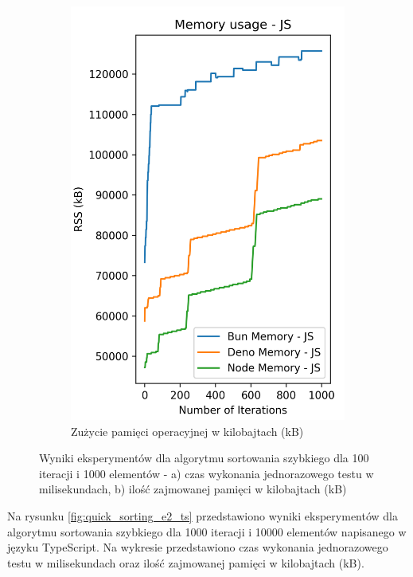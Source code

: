 \begin{figure}[H]
\begin{subfigure}[b]{0.4\textwidth}
    \includegraphics[width=\textwidth]{Figures/sorting/sorting_quick_1000_1000_js_memory.png}
    \caption{Zużycie pamięci operacyjnej w kilobajtach (kB)}
    \label{fig:quick_sorting_e2_memory}
  \end{subfigure}
  \caption{Wyniki eksperymentów dla algorytmu sortowania szybkiego dla 100 iteracji i 1000 elementów - a) czas wykonania jednorazowego testu w milisekundach, b) ilość zajmowanej pamięci w kilobajtach (kB)}
  \label{fig:quick_sorting_e2}
\end{figure}

Na rysunku \ref{fig:quick_sorting_e2_ts} przedstawiono wyniki eksperymentów dla algorytmu sortowania szybkiego dla 1000 iteracji i 10000 elementów napisanego w języku TypeScript. Na wykresie przedstawiono czas wykonania jednorazowego testu w milisekundach oraz ilość zajmowanej pamięci w kilobajtach (kB).

